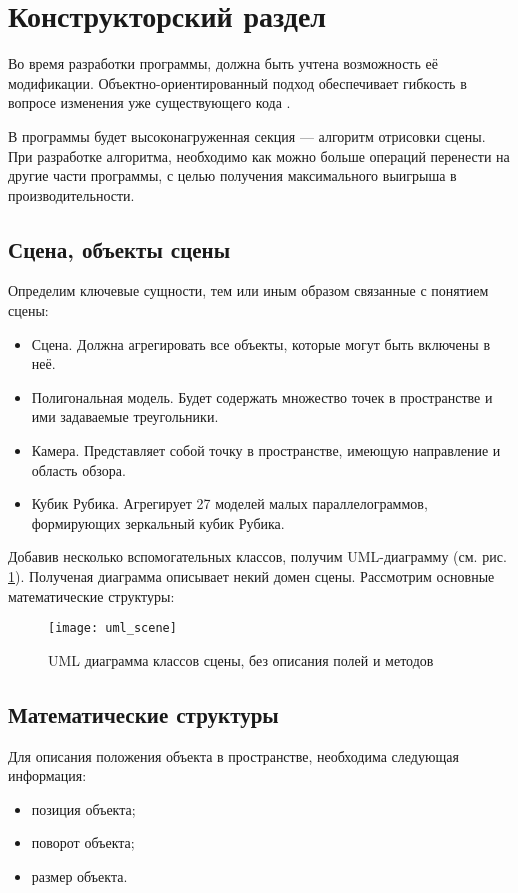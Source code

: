 \section{Конструкторский раздел}
Во время разработки программы, должна быть учтена возможность её модификации. Объектно-ориентированный подход обеспечивает гибкость в вопросе изменения уже существующего кода \cite{bib:oop_mod}.

В программы будет высоконагруженная секция --- алгоритм отрисовки сцены. При разработке алгоритма, необходимо как можно больше операций перенести на другие части программы, с целью получения максимального выигрыша в производительности.

\subsection{Сцена, объекты сцены}
Определим ключевые сущности, тем или иным образом связанные с понятием сцены:
\begin{itemize}
	\item Сцена. Должна агрегировать все объекты, которые могут быть включены в неё.
	\item Полигональная модель. Будет содержать множество точек в пространстве и ими задаваемые треугольники.
	\item Камера. Представляет собой точку в пространстве, имеющую направление и область обзора.
	\item Кубик Рубика. Агрегирует 27 моделей малых параллелограммов, формирующих зеркальный кубик Рубика.
\end{itemize}

Добавив несколько вспомогательных классов, получим UML-диаграмму (см. рис. \ref{fig:uml_scene}). Полученая диаграмма описывает некий домен сцены. Рассмотрим основные математические структуры:
\begin{figure}[ht]
	\centering
	\texttt{[image: uml\_scene]}
	\caption{UML диаграмма классов сцены, без описания полей и методов}
	\label{fig:uml_scene}
\end{figure}

\subsection{Математические структуры}
Для описания положения объекта в пространстве, необходима следующая информация:
\begin{itemize}
	\item позиция объекта;
	\item поворот объекта;
	\item размер объекта.
\end{itemize}


